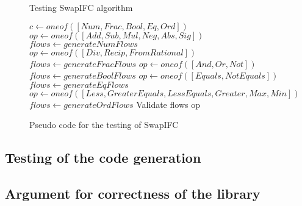 \begin{figure}[h]
  \begin{algorithm}[H]
    \caption{Testing SwapIFC algorithm}
    \begin{algorithmic}
      \State $c\gets oneof([Num, Frac, Bool, Eq, Ord])$
          \State $op\gets oneof([Add, Sub, Mul, Neg, Abs, Sig])$
          \State $flows\gets generateNumFlows$
      \EndIf        
          \State $op\gets oneof([Div, Recip, FromRational])$
          \State $flows\gets generateFracFlows$
      \EndIf
          \State $op\gets oneof([And, Or, Not])$
          \State $flows\gets generateBoolFlows$
      \EndIf
          \State $op\gets oneof([Equals, NotEquals])$
          \State $flows\gets generateEqFlows$
      \EndIf
          \State $op\gets oneof([Less, GreaterEquals, LessEquals, Greater, Max, Min])$
          \State $flows\gets generateOrdFlows$
      \EndIf
      \State
      \State
      \Return Validate flows op
    \end{algorithmic}
  \end{algorithm}
  \caption{Pseudo code for the testing of SwapIFC}
  \label{fig:testing_swapifc}
\end{figure}

\subsection{Testing of the code generation}

\subsection{Argument for correctness of the library}

